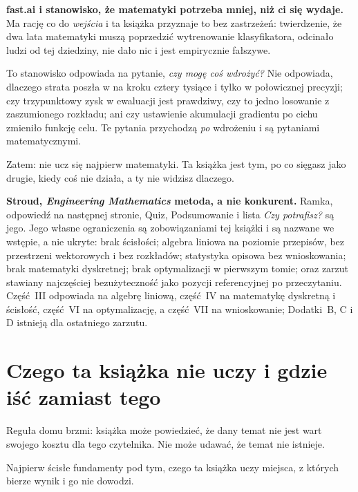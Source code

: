\medskip
\textbf{fast.ai i stanowisko, że matematyki potrzeba mniej, niż ci się
wydaje.} Ma rację co do \emph{wejścia} i ta książka przyznaje to bez
zastrzeżeń: twierdzenie, że dwa lata matematyki muszą poprzedzić wytrenowanie
klasyfikatora, odcinało ludzi od tej dziedziny, nie dało nic i jest empirycznie
fałszywe.

To stanowisko odpowiada na pytanie, \emph{czy mogę coś wdrożyć?} Nie odpowiada,
dlaczego strata poszła w  na kroku cztery tysiące i tylko w połowicznej
precyzji; czy trzypunktowy zysk w ewaluacji jest prawdziwy, czy to jedno
losowanie z zaszumionego rozkładu; ani czy ustawienie akumulacji gradientu po
cichu zmieniło funkcję celu. Te pytania przychodzą \emph{po} wdrożeniu i są
pytaniami matematycznymi.

Zatem: nie ucz się najpierw matematyki. Ta książka jest tym, po co sięgasz
jako drugie, kiedy coś nie działa, a ty nie widzisz dlaczego.

\medskip
\textbf{Stroud, \emph{Engineering Mathematics} \dash{} metoda, a nie
konkurent.} Ramka, odpowiedź na następnej stronie, Quiz, Podsumowanie i lista
\emph{Czy potrafisz?} są jego. Jego własne ograniczenia są zobowiązaniami tej
książki i są nazwane we wstępie, a nie ukryte:
brak ścisłości; algebra liniowa na poziomie przepisów, bez przestrzeni
wektorowych i bez rozkładów; statystyka opisowa bez wnioskowania; brak
matematyki dyskretnej; brak optymalizacji w pierwszym tomie; oraz \dash{}
zarzut stawiany najczęściej \dash{} bezużyteczność jako pozycji referencyjnej po
przeczytaniu. Część~III odpowiada na algebrę liniową, część~IV na matematykę
dyskretną i ścisłość, część~VI na optymalizację, a część~VII na wnioskowanie;
Dodatki~B, C i D istnieją dla ostatniego zarzutu.

\section{Czego ta książka nie uczy i gdzie iść zamiast tego}
\label{sec:E-not}

Reguła domu brzmi: książka może powiedzieć, że dany temat nie jest wart swojego
kosztu dla tego czytelnika. Nie może udawać, że temat nie istnieje.

Najpierw ścisłe fundamenty pod tym, czego ta książka uczy \dash{} miejsca, z
których bierze wynik i go nie dowodzi.

